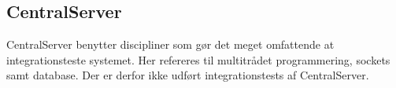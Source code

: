 \subsection{CentralServer}
CentralServer benytter discipliner som gør det meget omfattende at integrationsteste systemet. Her refereres til multitrådet programmering, sockets samt database. Der er derfor ikke udført integrationstests af CentralServer.